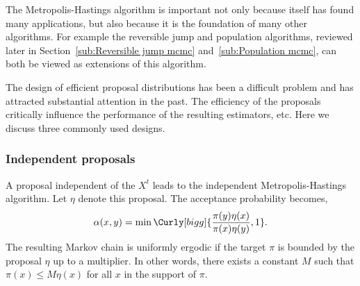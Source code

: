 The Metropolis-Hastings algorithm is important not only because itself has
found many applications, but also because it is the foundation of many other
algorithms. For example the reversible jump \mcmc and population \mcmc
algorithms, reviewed later in Section~\ref{sub:Reversible jump mcmc}
and~\ref{sub:Population mcmc}, can both be viewed as extensions of this
algorithm.

The design of efficient proposal distributions has been a difficult problem
and has attracted substantial attention in the past. The efficiency of the
proposals critically influence the performance of the resulting estimators,
etc. Here we discuss three commonly used designs.

\subsubsection{Independent proposals}
\label{ssub:Independent proposals}

A proposal independent of the $X^t$ leads to the independent
Metropolis-Hastings algorithm. Let $\eta$ denote this proposal. The acceptance
probability becomes,
\begin{equation}
  \alpha(x,y) = \min\Curly[bigg]{\frac{\pi(y)\eta(x)}{\pi(x)\eta(y)},1}.
\end{equation}
The resulting Markov chain is uniformly ergodic if the target $\pi$ is bounded
by the proposal $\eta$ up to a multiplier. In other words, there exists a
constant $M$ such that $\pi(x)\le M\eta(x)$ for all $x$ in the support of
$\pi$.


